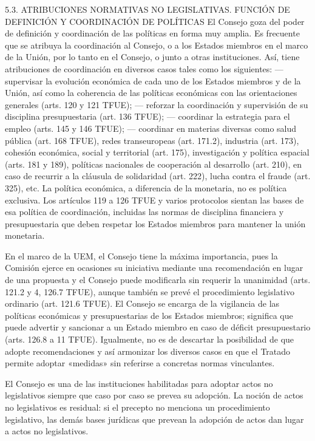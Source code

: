 \documentclass[10pt,a4paper]{article}
\begin{document}
5.3. ATRIBUCIONES NORMATIVAS NO LEGISLATIVAS. FUNCIÓN DE
DEFINICIÓN Y COORDINACIÓN DE POLÍTICAS
El Consejo goza del poder de definición y coordinación de las políticas en forma muy amplia. Es frecuente que se atribuya la coordinación al Consejo, o a los Estados miembros en el marco de la Unión, por lo tanto en el Consejo, o junto a otras instituciones. Así, tiene atribuciones de coordinación en diversos casos tales como los siguientes:
— supervisar la evolución económica de cada uno de los Estados miembros y de la Unión, así como la coherencia de las políticas económicas con las orientaciones generales (arts. 120 y 121 TFUE);
— reforzar la coordinación y supervisión de su disciplina presupuestaria (art. 136 TFUE);
— coordinar la estrategia para el empleo (arts. 145 y 146 TFUE);
— coordinar en materias diversas como salud pública (art. 168 TFUE), redes transeuropeas (art. 171.2), industria (art. 173), cohesión económica, social y territorial (art. 175), investigación y política espacial (arts. 181 y 189), políticas nacionales de cooperación al desarrollo (art. 210), en caso de recurrir a la cláusula de solidaridad (art. 222), lucha contra el fraude (art. 325), etc. La política económica, a diferencia de la monetaria, no es política exclusiva. Los artículos 119 a 126 TFUE y varios protocolos sientan las bases de esa política de coordinación, incluidas las normas de  disciplina financiera y presupuestaria que deben respetar los Estados miembros para mantener la unión monetaria.

En el marco de la UEM, el Consejo tiene la máxima importancia, pues la Comisión ejerce en ocasiones su iniciativa mediante una recomendación en lugar de una propuesta y el Consejo puede modificarla sin requerir la unanimidad (arts. 121.2 y 4, 126.7 TFUE), aunque también se prevé el procedimiento legislativo ordinario (art. 121.6 TFUE). El Consejo se encarga de la vigilancia de las políticas económicas y presupuestarias de los Estados miembros; significa que puede advertir y sancionar a un Estado miembro en caso de déficit presupuestario (arts. 126.8 a 11 TFUE). Igualmente, no es de descartar la posibilidad de que adopte recomendaciones y así armonizar los diversos casos en que el Tratado permite adoptar «medidas» sin referirse a concretas normas vinculantes.

El Consejo es una de las instituciones habilitadas para adoptar actos no legislativos siempre que caso por caso se prevea su adopción. La noción de actos no legislativos es residual: si el precepto no menciona un procedimiento legislativo, las demás bases jurídicas que prevean la adopción de actos dan lugar a actos no legislativos.
\end{document}
